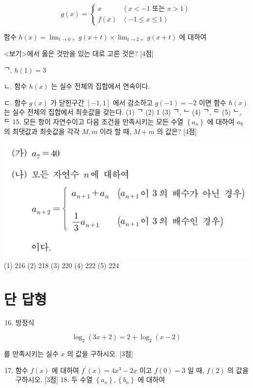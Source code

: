 \documentclass[10pt]{article}
\begin{document}
$$
g(x)= \begin{cases}x & (x<-1 \text { 또는 } x>1) \\ f(x) & (-1 \leq x \leq 1)\end{cases}
$$

함수 $h(x)=\lim _{t \rightarrow 0+} g(x+t) \times \lim _{t \rightarrow 2+} g(x+t)$ 에 대하여

<보기>에서 옳은 것만을 있는 대로 고른 것은? [4점]

ᄀ. $h(1)=3$

ㄴ. 함수 $h(x)$ 는 실수 전체의 집합에서 연속이다.

ㄷ. 함수 $g(x)$ 가 닫힌구간 $[-1,1]$ 에서 감소하고 $g(-1)=-2$ 이면 함수 $h(x)$ 는 실수 전체의 집합에서 최솟값을 갖는다.
(1) ᄀ
(2) 1
(3) ᄀ, ᄂ (4) ᄀ, ᄃ
(5) ᄂ, ᄃ 15. 모든 항이 자연수이고 다음 조건을 만족시키는 모든 수열 $\left\{a_{n}\right\}$ 에 대하여 $a_{9}$ 의 최댓값과 최솟값을 각각 $M, m$ 이라 할 때, $M+m$ 의 값은? [4점]

\includegraphics[max width=\textwidth, center]{2023_06_06_b380aa8523ec7afae994g-26}
(1) 216
(2) 218
(3) 220
(4) 222
(5) 224

\section{단 답형}
\begin{enumerate}
  \setcounter{enumi}{15}
  \item 방정식
\end{enumerate}

$$
\log _{2}(3 x+2)=2+\log _{2}(x-2)
$$

를 만족시키는 실수 $x$ 의 값을 구하시오. [3점]

\begin{enumerate}
  \setcounter{enumi}{16}
  \item 함수 $f(x)$ 에 대하여 $f^{\prime}(x)=4 x^{3}-2 x$ 이고 $f(0)=3$ 일 때, $f(2)$ 의 값을 구하시오. [3점] 18. 두 수열 $\left\{a_{n}\right\},\left\{b_{n}\right\}$ 에 대하여
\end{enumerate}
\end{document}
